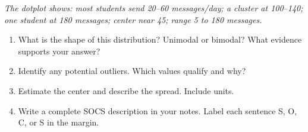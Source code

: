 \documentclass[aspectratio=169, 11pt]{beamer}
\begin{document}
{
\begin{frame}[t, plain]
  \vspace{1.2cm}\par
  \vspace{0.3em}%
  \hspace{0.55cm}%
  \begin{minipage}{0.9\textwidth}
    \small

    \textit{The dotplot shows: most students send 20--60 messages/day;
    a cluster at 100--140; one student at 180 messages; center near 45;
    range 5 to 180 messages.}

    \vspace{0.6em}
    \begin{enumerate}
      \setlength{\itemsep}{0.5em}
      \item What is the shape of this distribution? Unimodal or bimodal?
            What evidence supports your answer?
      \item Identify any potential outliers. Which values qualify and why?
      \item Estimate the center and describe the spread. Include units.
      \item Write a complete SOCS description in your notes. Label each
            sentence S, O, C, or S in the margin.
    \end{enumerate}
  \end{minipage}
\end{frame}
}
\end{document}
